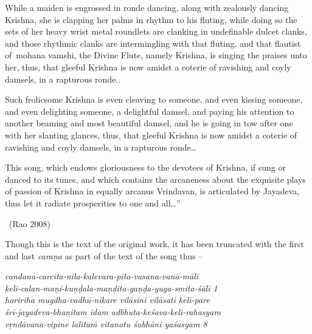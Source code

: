 \begin{myquote}
While a maiden is engrossed in ronde dancing, along with zealously dancing Krishna, she is clapping her palms in rhythm to his fluting, while doing so the sets of her heavy wrist metal roundlets are clanking in undefinable dulcet clanks, and those rhythmic clanks are intermingling with that fluting, and that flautist of mohana vamshi, the Divine Flute, namely Krishna, is singing the praises unto her, thus, that gleeful Krishna is now amidst a coterie of ravishing and coyly damsels, in a rapturous ronde..
\end{myquote}

\begin{myquote}
Such frolicsome Krishna is even cleaving to someone, and even kissing someone, and even delighting someone, a delightful damsel, and paying his attention to another beaming and most beautiful damsel, and he is going in tow after one with her slanting glances, thus, that gleeful Krishna is now amidst a coterie of ravishing and coyly damsels, in a rapturous ronde…
\end{myquote}

\newpage

\begin{myquote}
This song, which endows gloriousness to the devotees of Krishna, if sung or danced to its tunes, and which contains the arcaneness about the exquisite plays of passion of Krishna in equally arcanus Vrindavan, is articulated by Jayadeva, thus let it radiate prosperities to one and all…” 

~\hfill (Rao 2008)
\end{myquote}

Though this is the text of the original work, it has been truncated with the first and last \textit{caraṇa} as part of the text of the song thus –

\begin{myquote}
\textit{candana-carcita-nīla-kalevara-pīta-vasana-vana-mālī }\\ \textit{keli-calan-maṇi-kuṇḍala-maṇḍita-gaṇḍa-yuga-smita-śālī  1 }\\ \textit{haririha mugdha-vadhū-nikare vilāsini vilāsati kelī-pare}\\ \textit{śrī-jayadeva-bhaṇitam idam adbhuta-keśava-keli-rahasyam } \\ \textit{vṛndāvana-vipine lalitaṁ vitanotu śubhāni yaśasyam  8 }
\end{myquote}

